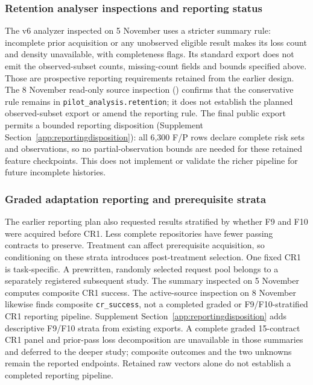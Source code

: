 \subsubsection{Retention analyser inspections and reporting status}

The v6 analyzer inspected on 5 November uses a stricter summary rule: incomplete prior
acquisition or any unobserved eligible result makes its loss count and
density unavailable, with completeness flags. Its standard export does
not emit the observed-subset counts, missing-count fields and bounds
specified above. Those are prospective reporting requirements retained
from the earlier design. The 8 November read-only source inspection
() confirms that the conservative rule remains in
\texttt{pilot\_analysis.retention}; it does not establish the planned
observed-subset export or amend the reporting rule.
The final public export permits a bounded reporting disposition
(Supplement Section~\ref{app:reportingdisposition}): all 6,300 F/P rows
declare complete risk sets and observations, so no partial-observation
bounds are needed for these retained feature checkpoints. This does not
implement or validate the richer pipeline for future incomplete histories.

\subsubsection{Graded adaptation reporting and prerequisite strata}

The earlier reporting plan also requested results stratified by whether
F9 and F10 were acquired before CR1. Less complete repositories have fewer
passing contracts to preserve. Treatment can affect prerequisite acquisition,
so conditioning on these strata introduces post-treatment selection.
One fixed CR1 is task-specific. A prewritten, randomly selected request
pool belongs to a separately registered subsequent study.
The summary inspected on 5 November computes composite CR1 success. The
active-source inspection on 8 November likewise finds composite
\texttt{cr\_success}, not a completed graded or F9/F10-stratified CR1
reporting pipeline. Supplement Section~\ref{app:reportingdisposition}
adds descriptive F9/F10 strata from existing exports. A complete graded
15-contract CR1 panel and prior-pass loss decomposition are unavailable in
those summaries and deferred to the deeper study; composite outcomes and
the two unknowns remain the reported endpoints. Retained raw vectors alone
do not establish a completed reporting pipeline.

